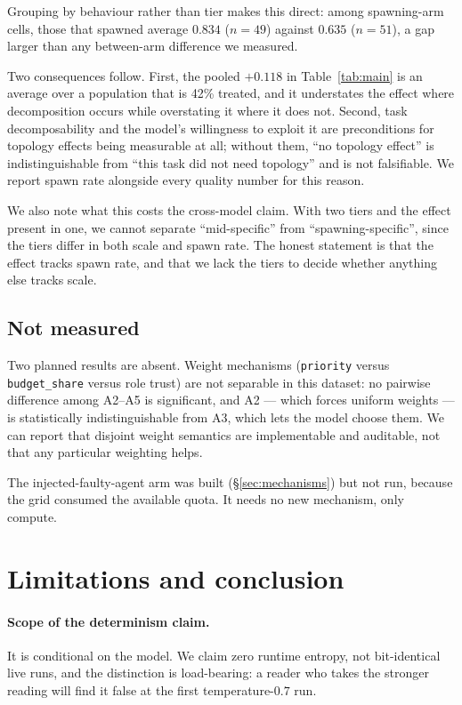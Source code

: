 \documentclass[10pt]{article}
\begin{document}
Grouping by behaviour rather than tier makes this direct: among spawning-arm
cells, those that spawned average $0.834$ ($n = 49$) against $0.635$ ($n = 51$),
a gap larger than any between-arm difference we measured.

Two consequences follow. First, the pooled $+0.118$ in Table~\ref{tab:main} is
an average over a population that is 42\% treated, and it understates the effect
where decomposition occurs while overstating it where it does not. Second, task
decomposability and the model's willingness to exploit it are preconditions for
topology effects being measurable at all; without them, ``no topology effect''
is indistinguishable from ``this task did not need topology'' and is not
falsifiable. We report spawn rate alongside every quality number for this
reason.

We also note what this costs the cross-model claim. With two tiers and the
effect present in one, we cannot separate ``mid-specific'' from
``spawning-specific'', since the tiers differ in both scale and spawn rate. The
honest statement is that the effect tracks spawn rate, and that we lack the tiers
to decide whether anything else tracks scale.

\subsection{Not measured}

Two planned results are absent. Weight mechanisms (\texttt{priority} versus
\texttt{budget\_share} versus role trust) are not separable in this dataset: no
pairwise difference among A2--A5 is significant, and A2 --- which forces uniform
weights --- is statistically indistinguishable from A3, which lets the model
choose them. We can report that disjoint weight semantics are implementable and
auditable, not that any particular weighting helps.

The injected-faulty-agent arm was built (\S\ref{sec:mechanisms}) but not run,
because the grid consumed the available quota. It needs no new mechanism, only
compute.

\section{Limitations and conclusion}
\label{sec:limits}

\paragraph{Scope of the determinism claim.}
It is conditional on the model. We claim zero runtime entropy, not bit-identical
live runs, and the distinction is load-bearing: a reader who takes the stronger
reading will find it false at the first temperature-$0.7$ run.
\end{document}
